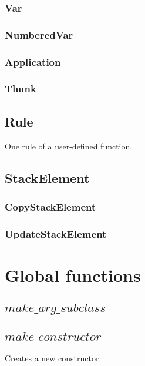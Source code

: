 \subsubsection{Var}

\subsubsection{NumberedVar}

\subsubsection{Application}

\subsubsection{Thunk}

\subsection{Rule}

One rule of a user-defined function.

\subsection{StackElement}

\subsubsection{CopyStackElement}

\subsubsection{UpdateStackElement}

\section{Global functions}

\subsection{$make\_arg\_subclass$}

\subsection{$make\_constructor$}

Creates a new constructor.

